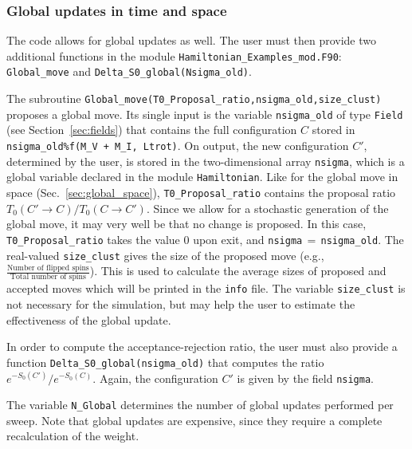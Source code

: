 \subsubsection{Global updates in time and space}
%  
The code allows for global updates as well. The user must then provide two additional functions in the module \texttt{Hamiltonian\_Examples\_mod.F90}: \texttt{Global\_move} and \texttt{Delta\_\-S0\_\-global(Nsigma\_old)}.   


The subroutine  \texttt{Global\_move(T0\_Proposal\_ratio,nsigma\_old,size\_clust)}  proposes  a global move. 
Its single input is the variable \texttt{nsigma\_old} of type \texttt{Field} (see Section~\ref{sec:fields}) that contains  the full  configuration $C$ stored in \texttt{nsigma\_old\%f(M\_V + M\_I, Ltrot)}.  On output, the new configuration $C'$, determined by the user,  is stored in the two-dimensional array \texttt{nsigma}, which is a global variable declared in the module \texttt{Hamiltonian}.
Like for the global move in space (Sec.~\ref{sec:global_space}), \texttt{T0\_Proposal\_ratio} contains the proposal ratio $T_0(C' \rightarrow C) / T_0(C \rightarrow C') $.
Since we allow for a stochastic  generation of  the global move, it may very well be that no change is proposed. In this case, \texttt{T0\_Proposal\_ratio}   takes the value 0 upon exit, and  \texttt{nsigma$\,=\,$nsigma\_old}.   
The real-valued \texttt{size\_clust} gives the size of the proposed move (e.g., $\tfrac{\text{Number of flipped spins}}{\text{Total number of spins}}$). This is used to calculate the average sizes of proposed and accepted moves which will be printed in the \texttt{info} file. The variable \texttt{size\_clust} is not necessary for the simulation, but may help the user to estimate the effectiveness of the global update.

In order to compute the acceptance-rejection ratio,  the user must also provide a function \linebreak
\texttt{Delta\_\-S0\_\-global(nsigma\_old)} that computes the ratio $e^{-S_0(C')}/e^{-S_0(C)}$. Again, the configuration $C'$ is given by the field \texttt{nsigma}.

The variable \texttt{N\_Global} determines the number of global updates performed per sweep. Note that global updates are expensive, since they require a complete recalculation of the weight.
% 

